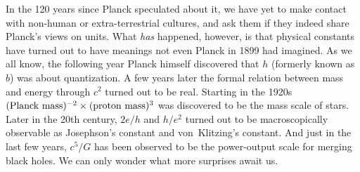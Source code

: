 \documentclass[aps,prb,12pt]{revtex4-1}
\begin{document}
In the 120 years since Planck speculated about it, we have yet to make
contact with non-human or extra-terrestrial cultures, and ask them if
they indeed share Planck's views on units.  What {\em has} happened,
however, is that physical constants have turned out to have meanings
not even Planck in 1899 had imagined.  As we all know, the following
year Planck himself discovered that $h$ (formerly known as $b$) was
about quantization.  A few years later the formal relation between
mass and energy through $c^2$ turned out to be real.  Starting in the
1920s $(\hbox{Planck mass})^{-2}\times(\hbox{proton mass})^3$ was
discovered to be the mass scale of stars.  Later in the 20th century,
$2e/h$ and $h/e^2$ turned out to be macroscopically observable as
Josephson's constant and von~Klitzing's constant.  And just in the
last few years, $c^5/G$ has been observed to be the power-output scale
for merging black holes.  We can only wonder what more surprises await
us.

\def\aj{AJ}
\def\apjl{ApJL}
\def\aap{A\&A}
\def\mnras{MNRAS}
\def\pasj{PASJ}
\def\jgr{JGR}



\end{document}
